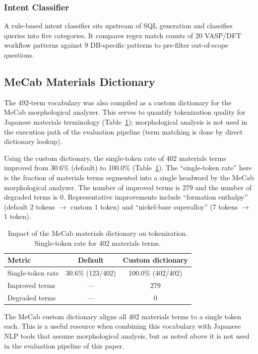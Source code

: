 \subsubsection{Intent Classifier}

A rule-based intent classifier sits upstream of SQL generation and classifies queries into five categories. It compares regex match counts of 20 VASP/DFT workflow patterns against 9 DB-specific patterns to pre-filter out-of-scope questions.


\subsection{MeCab Materials Dictionary}

The 492-term vocabulary was also compiled as a custom dictionary for the MeCab morphological analyzer. This serves to quantify tokenization quality for Japanese materials terminology (Table~\ref{tab:mecab}); morphological analysis is not used in the execution path of the evaluation pipeline (term matching is done by direct dictionary lookup).

Using the custom dictionary, the single-token rate of 402 materials terms improved from 30.6\% (default) to 100.0\% (Table~\ref{tab:mecab}). The ``single-token rate'' here is the fraction of materials terms segmented into a single headword by the MeCab morphological analyzer. The number of improved terms is 279 and the number of degraded terms is 0. Representative improvements include ``formation enthalpy'' (default 2 tokens $\to$ custom 1 token) and ``nickel-base superalloy'' (7 tokens $\to$ 1 token).

\begin{table}[t]
\centering
\caption{Impact of the MeCab materials dictionary on tokenization.
Single-token rate for 402 materials terms.}
\label{tab:mecab}
\small
\begin{tabular}{@{}lcc@{}}
\toprule
Metric & Default & Custom dictionary \\
\midrule
Single-token rate & 30.6\% (123/402) & 100.0\% (402/402) \\
Improved terms & --- & 279 \\
Degraded terms & --- & 0 \\
\bottomrule
\end{tabular}
\end{table}

The MeCab custom dictionary aligns all 402 materials terms to a single token each. This is a useful resource when combining this vocabulary with Japanese NLP tools that assume morphological analysis, but as noted above it is not used in the evaluation pipeline of this paper.


